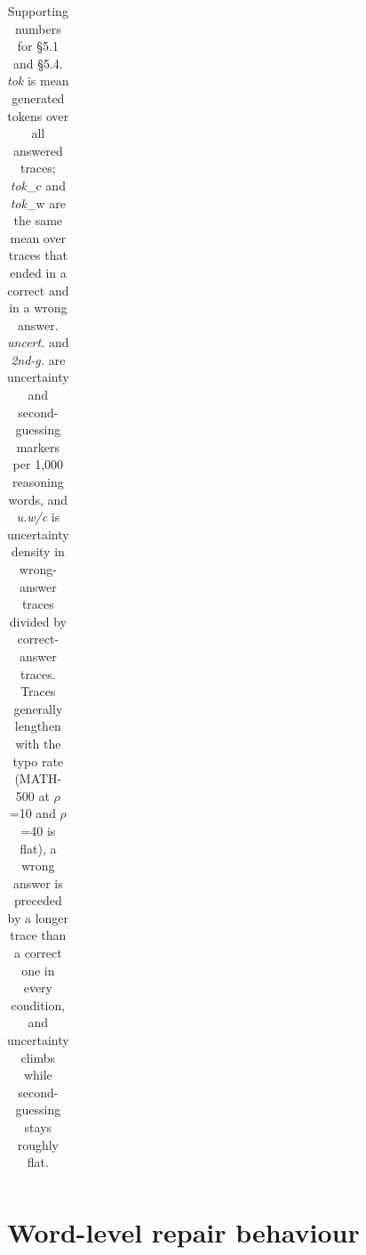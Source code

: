 \documentclass[11pt]{article}
\begin{document}
\begin{table}[H]
{\begin{tabular}{lrrrrrrrrrrrrrrrrrr}
\bottomrule
\end{tabular}}
\caption{Supporting numbers for \S5.1 and \S5.4. \emph{tok} is mean generated tokens over all answered traces; \emph{tok}\_c and \emph{tok}\_w are the same mean over traces that ended in a correct and in a wrong answer. \emph{uncert.} and \emph{2nd-g.} are uncertainty and second-guessing markers per 1,000 reasoning words, and \emph{u.w/c} is uncertainty density in wrong-answer traces divided by correct-answer traces. Traces generally lengthen with the typo rate (MATH-500 at $\rho$=10 and $\rho$=40 is flat), a wrong answer is preceded by a longer trace than a correct one in every condition, and uncertainty climbs while second-guessing stays roughly flat.}
\label{tab:7}
\end{table}
\section{Word-level repair behaviour}
\end{document}
